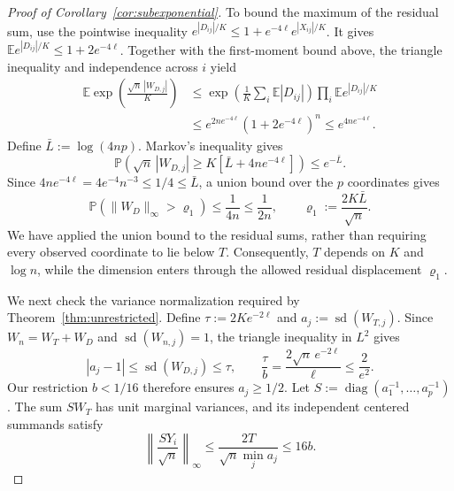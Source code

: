 \documentclass[11pt,letterpaper]{article}
\theoremstyle{remark}
\newcommand{\E}{\mathbb E}
\newcommand{\Pp}{\mathbb P}
\begin{document}
\begin{proof}[Proof of Corollary~\ref{cor:subexponential}]
To bound the maximum of the residual sum, use the pointwise inequality
$e^{|D_{ij}|/K}\le1+e^{-4\ell}e^{|X_{ij}|/K}$.
It gives $\E e^{|D_{ij}|/K}\le1+2e^{-4\ell}$.
Together with the first-moment bound above, the triangle inequality
and independence across $i$ yield
\begin{align*}
 \E\exp\!\left(\frac{\sqrt n\,|W_{D,j}|}{K}\right)
 &\le\exp\!\left(\frac1K\sum_i\E|D_{ij}|\right)
          \prod_i\E e^{|D_{ij}|/K}\\
 &\le e^{2ne^{-4\ell}}(1+2e^{-4\ell})^n
 \le e^{4ne^{-4\ell}}.
\end{align*}
Define $\bar L:=\log(4np)$. Markov's inequality gives
\[
 \Pp\!\left(\sqrt n\,|W_{D,j}|\ge K[\bar L+4ne^{-4\ell}]\right)
 \le e^{-\bar L}.
\]
Since $4ne^{-4\ell}=4e^{-4}n^{-3}\le1/4\le\bar L$, a union
bound over the $p$ coordinates gives
\begin{equation}
 \Pp(\|W_D\|_\infty>\varrho_1)\le\frac1{4n}\le\frac1{2n},
 \qquad \varrho_1:=\frac{2K\bar L}{\sqrt n}.
 \label{tail:sum-coupling}
\end{equation}
We have applied the union bound to the residual sums, rather than
requiring every observed coordinate to lie below $T$.
Consequently, $T$ depends on $K$ and $\log n$, while the dimension
enters through the allowed residual displacement $\varrho_1$.

We next check the variance normalization required by
Theorem~\ref{thm:unrestricted}. Define
$\tau:=2Ke^{-2\ell}$ and $a_j:=\operatorname{sd}(W_{T,j})$.
Since $W_n=W_T+W_D$ and $\operatorname{sd}(W_{n,j})=1$, the
triangle inequality in $L^2$ gives
\[
 |a_j-1|\le\operatorname{sd}(W_{D,j})\le\tau,
 \qquad \frac\tau b=\frac{2\sqrt n\,e^{-2\ell}}\ell
 \le\frac2{e^2}.
\]
Our restriction $b<1/16$ therefore ensures $a_j\ge1/2$.
Let $S:=\operatorname{diag}(a_1^{-1},\ldots,a_p^{-1})$.
The sum $SW_T$ has unit marginal variances, and its independent
centered summands satisfy
\[
 \left\|\frac{SY_i}{\sqrt n}\right\|_\infty
 \le\frac{2T}{\sqrt n\min_j a_j}\le16b.
\]


\end{proof}
\end{document}
